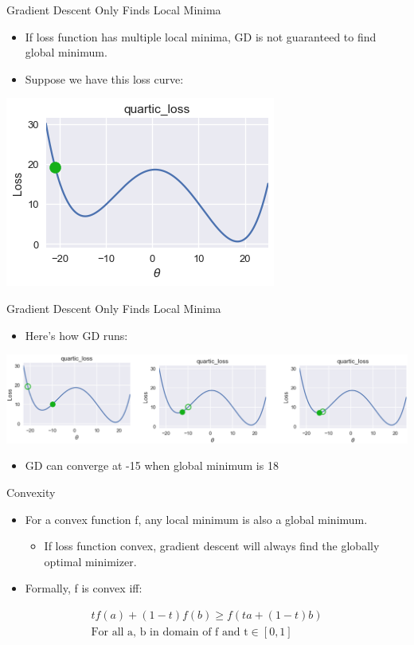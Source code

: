 \documentclass[aspectratio=169]{../latex_main/tntbeamer}  %
\begin{document}
	
	
	\begin{frame}{Gradient Descent Only Finds Local Minima}
	    \begin{itemize}
	        \item If loss function has multiple local minima, GD is not guaranteed to find global minimum.
	        \item Suppose we have this loss curve:
	    \end{itemize}
	    \centering
	    \includegraphics[scale=.7]{Bild5}
	\end{frame}
	
	
	
	\begin{frame}{Gradient Descent Only Finds Local Minima}
	    \begin{itemize}
	        \item Here’s how GD runs:
	    \end{itemize}
	    \centering
	    \includegraphics[scale=.4]{Bild6}
	    \begin{itemize}
	        \item GD can converge at -15 when global minimum is 18
	    \end{itemize}
	\end{frame}
	
	
	\begin{frame}{Convexity}
	    \begin{itemize}
	        \item For a convex function f, any local minimum is also a global minimum.
	        \begin{itemize}
	            \item If loss function convex, gradient descent will always find the globally optimal minimizer.
	        \end{itemize}
	        \item Formally, f is convex iff:
	    \end{itemize}
	    
	    \begin{align*}
	        tf(a)+(1-t)f(b)\geq f(ta + (1 - t)b)\\
	        \text{For all a, b in domain of f and t} \in [0,1]
	    \end{align*}
	\end{frame}
	
\end{document}

